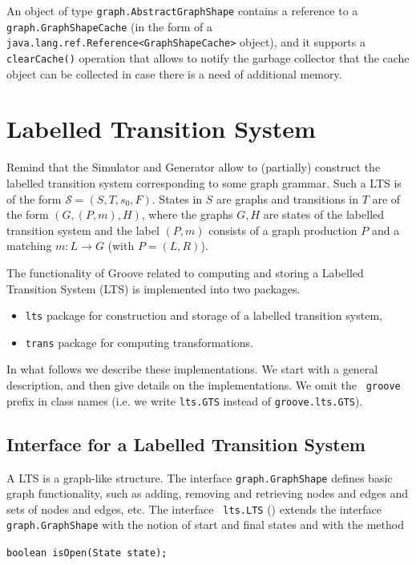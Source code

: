 An object of type {\tt graph.AbstractGraphShape} contains a reference to a
{\tt graph.GraphShapeCache} (in the form of a {\tt
  java.lang.ref.Reference<GraphShapeCache>} object), and it supports a {\tt
  clearCache()} operation that allows to notify the garbage collector that
the cache object can be collected in case there is a need of additional
memory.

\section{Labelled Transition System}

Remind that the \GROOVE Simulator and Generator allow to (partially)
construct the labelled transition system corresponding to some graph
grammar. Such a LTS is of the form $\mathcal S = (S, T, s_0, F)$. States in
$S$ are graphs and transitions in $T$ are of the form $(G, (P,m), H)$,
where the graphs $G,H$ are states of the labelled transition system and the
label $(P,m)$ consists of a graph production $P$ and a matching $m: L \to
G$ (with $P = (L, R)$).

The functionality of Groove related to computing and storing a Labelled
Transition System (LTS) is implemented into two packages.
\begin{itemize}
\item \texttt{lts} package for construction and storage of a labelled transition system,
\item \texttt{trans} package for computing transformations.
\end{itemize}
In what follows we describe these implementations. We start with a general
description, and then give details on the implementations. We omit the {\tt
  groove} prefix in class names (i.e. we write {\tt lts.GTS} instead of
{\tt groove.lts.GTS}).

\subsection{Interface for a Labelled Transition System}
A LTS is a graph-like structure. The interface {\tt graph.GraphShape}
defines basic graph functionality, such as adding, removing and retrieving
nodes and edges and sets of nodes and edges, etc. The interface {\tt
  lts.LTS} () extends the interface {\tt
  graph.GraphShape} with the notion of start and final states and with the
method

\smallskip\noindent%
{\tt boolean isOpen(State state);}

